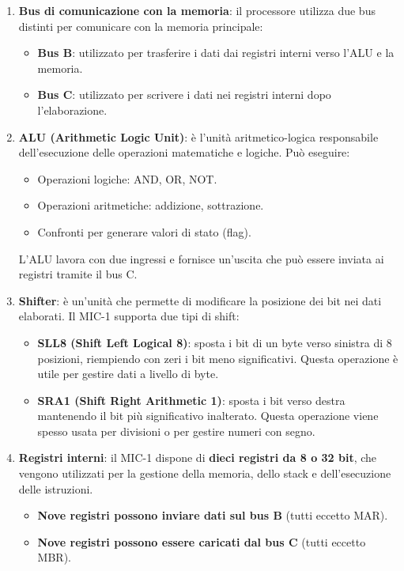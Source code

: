 \begin{enumerate}
    \item \textbf{Bus di comunicazione con la memoria}: il processore utilizza due bus distinti per comunicare con la memoria principale:
    \begin{itemize}
        \item \textbf{Bus B}: utilizzato per trasferire i dati dai registri interni verso l'ALU e la memoria.
        \item \textbf{Bus C}: utilizzato per scrivere i dati nei registri interni dopo l'elaborazione.
    \end{itemize}

    \item \textbf{ALU (Arithmetic Logic Unit)}: è l'unità aritmetico-logica responsabile dell'esecuzione delle operazioni matematiche e logiche. Può eseguire:
    \begin{itemize}
        \item Operazioni logiche: AND, OR, NOT.
        \item Operazioni aritmetiche: addizione, sottrazione.
        \item Confronti per generare valori di stato (flag).
    \end{itemize}
    L'ALU lavora con due ingressi e fornisce un'uscita che può essere inviata ai registri tramite il bus C.

    \item \textbf{Shifter}: è un'unità che permette di modificare la posizione dei bit nei dati elaborati. Il MIC-1 supporta due tipi di shift:
    \begin{itemize}
        \item \textbf{SLL8 (Shift Left Logical 8)}: sposta i bit di un byte verso sinistra di 8 posizioni, riempiendo con zeri i bit meno significativi. Questa operazione è utile per gestire dati a livello di byte.
        \item \textbf{SRA1 (Shift Right Arithmetic 1)}: sposta i bit verso destra mantenendo il bit più significativo inalterato. Questa operazione viene spesso usata per divisioni o per gestire numeri con segno.
    \end{itemize}

    \item \textbf{Registri interni}: il MIC-1 dispone di \textbf{dieci registri da 8 o 32 bit}, che vengono utilizzati per la gestione della memoria, dello stack e dell'esecuzione delle istruzioni.
    \begin{itemize}
        \item \textbf{Nove registri possono inviare dati sul bus B} (tutti eccetto MAR).
        \item \textbf{Nove registri possono essere caricati dal bus C} (tutti eccetto MBR).
    \end{itemize}
\end{enumerate}

